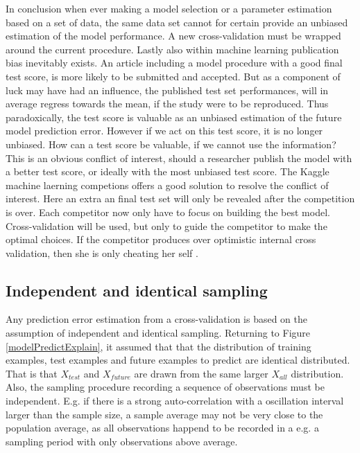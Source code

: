 In conclusion when ever making a model selection or a parameter estimation based on a set of data, the same data set cannot for certain provide an unbiased estimation of the model performance. A new cross-validation must be wrapped around the current procedure. Lastly also within machine learning publication bias inevitably exists. An article including a model procedure with a good final test score, is more likely to be submitted and accepted. But as a component of luck may have had an influence, the published test set performances, will in average regress towards the mean, if the study were to be reproduced. Thus paradoxically, the test score is valuable as an unbiased estimation of the future model prediction error. However if we act on this test score, it is no longer unbiased. How can a test score be valuable, if we cannot use the information? This is an obvious conflict of interest, should a researcher publish the model with a better test score, or ideally with the most unbiased test score. The Kaggle machine laerning competions offers a good solution to resolve the conflict of interest. Here an extra an final test set will only be revealed after the competition is over. Each competitor now only have to focus on building the best model. Cross-validation will be used, but only to guide the competitor to make the optimal choices. If the competitor produces over optimistic internal cross validation, then she is only cheating her self \cite{seroussi2015steps}.

\subsection{Independent and identical sampling}
Any prediction error estimation from a cross-validation is based on the assumption of independent and identical sampling. Returning to Figure \ref{modelPredictExplain}, it assumed that that the distribution of training examples, test examples and future examples to predict are identical distributed. That is that $X_{test}$ and $X_{future}$ are drawn from the same larger $X_{all}$ distribution. Also, the sampling procedure recording a sequence of observations must be independent. E.g. if there is a strong auto-correlation with a oscillation interval larger than the sample size, a sample average may not be very close to the population average, as all observations happend to be recorded in a e.g. a sampling period with only observations above average.


